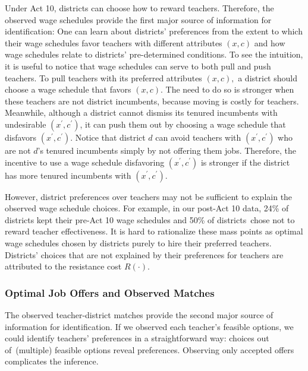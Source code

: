 \documentclass[notitlepage,12pt]{article}%
\begin{document}
Under Act 10, districts can choose how to reward teachers. Therefore, the
observed wage schedules provide the first major source of information for
identification: One can learn about districts' preferences from the extent to
which their wage schedules favor teachers with different attributes $\left(
x,c\right)  $ and how wage schedules relate to districts' pre-determined
conditions. To see the intuition, it is useful to notice that wage schedules
can serve to both pull and push teachers. To pull teachers with its preferred
attributes $\left(  x,c\right)  ,$ a district should choose a wage schedule
that favors $\left(  x,c\right)  $. The need to do so is stronger when these
teachers are not district incumbents, because moving is costly for teachers.
Meanwhile, although a district cannot dismiss its tenured incumbents with
undesirable $\left(  x^{\prime},c^{\prime}\right)  $, it can push them out by
choosing a wage schedule that disfavors $\left(  x^{\prime},c^{\prime}\right)
$. Notice that district $d$ can avoid teachers with $\left(  x^{\prime
},c^{\prime}\right)  $ who are not $d$'s tenured incumbents simply by not
offering them jobs. Therefore, the incentive to use a wage schedule
disfavoring $\left(  x^{\prime},c^{\prime}\right)  $ is stronger if the
district has more tenured incumbents with $\left(  x^{\prime},c^{\prime
}\right)  .$

However, district preferences over teachers may not be sufficient to explain
the observed wage schedule choices. For example, in our post-Act 10 data, 24\%
of districts kept their pre-Act 10 wage schedules and 50\% of districts\ chose
not to reward teacher effectiveness. It is hard to rationalize these mass
points as optimal wage schedules chosen by districts purely to hire their
preferred teachers. Districts' choices that are not explained by their
preferences for teachers are attributed to the resistance cost $R\left(
\cdot\right)  .$

\subsubsection{Optimal Job Offers and Observed Matches\label{id1}}

The observed teacher-district matches provide the second major source of
information for identification. If we observed each teacher's feasible options, we could identify teachers' preferences in a straightforward
way: choices out of\ (multiple) feasible options reveal preferences. Observing
only accepted offers complicates the inference.
\end{document}
